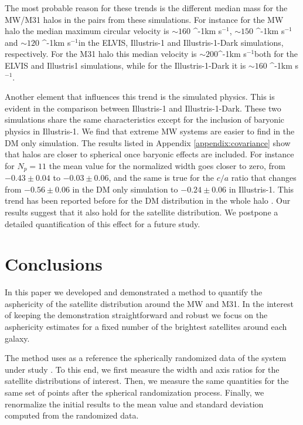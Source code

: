 \documentclass[a4paper,fleqn,usenatbib]{mnras}
\newcommand{\kms}{\ifmmode\mathrm{km\ s}^{-1}\else km s$^{-1}$\fi}
\begin{document}
The most probable reason for these trends is the different median mass
for the MW/M31 halos in the pairs from these simulations. 
For instance for the MW halo the median maximum circular velocity is
$\sim 160$ \kms, $\sim 150$ \kms and $\sim 120$ \kms in the ELVIS,
Illustris-1 and Illustris-1-Dark simulations, respectively.
For the M31 halo this median velocity is $\sim 200$\kms both for the
ELVIS and Illustris1 simulations, while for the Illustris-1-Dark it is
$\sim 160$ \kms. 

Another element that influences this trend is the simulated physics.
This is evident in the comparison between Illustris-1 and Illustris-1-Dark.
These two simulations share the same characteristics except for the
inclusion of baryonic physics in Illustris-1.
We find that extreme MW systems are easier to find in the DM only
simulation. 
The results listed in Appendix \ref{appendix:covariance} show that
halos are closer to spherical once baryonic effects are included. 
For instance for $N_p=11$ the mean value for the normalized width goes
closer to zero, from $-0.43\pm 0.04$  to $-0.03\pm0.06$, and the same
is true for the $c/a$ ratio that changes from $-0.56\pm0.06$ in the DM
only simulation to $-0.24\pm 0.06$ in Illustris-1.  
This trend has been reported before for the DM distribution in the
whole halo \cite{2013MNRAS.429.3316B}.
Our results suggest that it also hold for the satellite distribution.
We postpone a detailed quantification of this effect for a future
study.  

\section{Conclusions}\label{sec:conclusions}

In this paper we developed and demonstrated a method to quantify the
asphericity of the satellite distribution around the MW and M31.  
In the interest of keeping the demonstration straightforward and robust we
focus on the asphericity estimates for a fixed number of the brightest
satellites around each galaxy. 

The method uses as a reference the spherically randomized data
of the system under study \citep{2017AN....338..854P}.  
To this end, we first measure the width and axis ratios for the satellite
distributions of interest. 
Then, we measure the same quantities for the same set of points after
the spherical randomization process.
Finally, we renormalize the initial results to the mean value and
standard deviation computed from the randomized data.  
\end{document}
